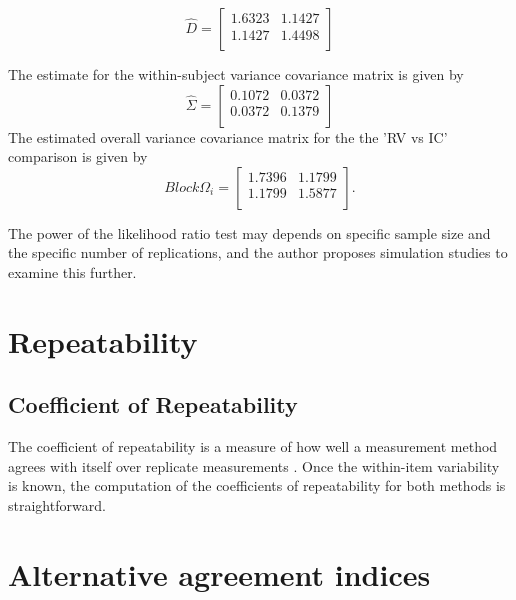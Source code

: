 \documentclass[12pt, a4paper]{report}
\theoremstyle{plain}
\theoremstyle{definition}
\theoremstyle{remark}
\begin{document}
	
	\begin{equation}
	\hat{D}= \left[ \begin{array}{cc}
	1.6323 & 1.1427  \\
	1.1427 & 1.4498 \\
	\end{array} \right]
	\end{equation}
	
	The estimate for the within-subject variance covariance matrix is
	given by
	\begin{equation}
	\hat{\Sigma}= \left[ \begin{array}{cc}
	0.1072 & 0.0372  \\
	0.0372 & 0.1379  \\
	\end{array}\right]
	\end{equation}
	The estimated overall variance covariance matrix for the the 'RV
	vs IC' comparison is given by
	\begin{equation}
	Block \Omega_{i}= \left[ \begin{array}{cc}
	1.7396 & 1.1799  \\
	1.1799 & 1.5877  \\
	\end{array} \right].
	\end{equation}
	
	The power of the likelihood ratio test may depends on specific sample size and the
	specific number of  replications, and the author proposes simulation studies to examine this further.
	
	

	\chapter{Repeatability}
	
	\section{Coefficient of Repeatability}
	The coefficient of repeatability is a measure of how well a
	measurement method agrees with itself over replicate measurements
	\citep{BA99}. Once the within-item variability is known, the
	computation of the coefficients of repeatability for both methods
	is straightforward.
	
	
	

	\chapter{Alternative agreement indices}
	
\end{document}
